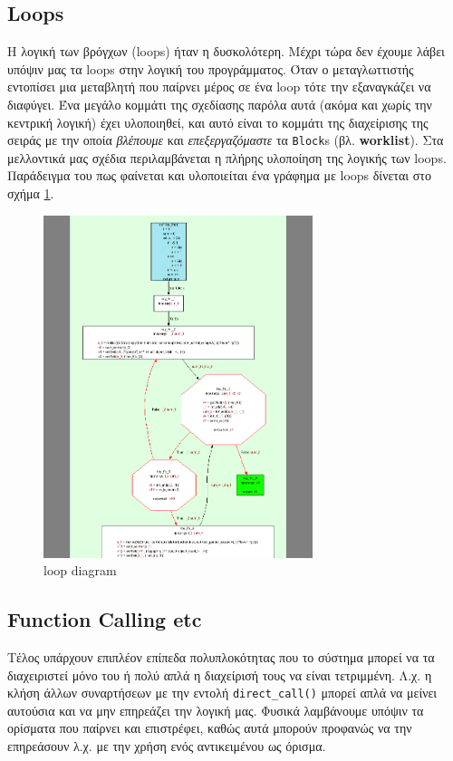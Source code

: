 \subsection{Loops}

Η λογική των βρόγχων (loops) ήταν η δυσκολότερη. Μέχρι τώρα δεν έχουμε λάβει
υπόψιν μας τα loops στην λογική του προγράμματος. Όταν ο μεταγλωττιστής
εντοπίσει μια μεταβλητή που παίρνει μέρος σε ένα loop τότε την εξαναγκάζει να
διαφύγει. Ένα μεγάλο κομμάτι της σχεδίασης παρόλα αυτά (ακόμα και χωρίς την
κεντρική λογική) έχει υλοποιηθεί, και αυτό είναι το κομμάτι της διαχείρισης της
σειράς με την οποία \textit{βλέπουμε} και \textit{επεξεργαζόμαστε} τα
\texttt{Block}s (βλ. \textbf{worklist}). Στα μελλοντικά μας σχέδια
περιλαμβάνεται η πλήρης υλοποίηση της λογικής των loops. Παράδειγμα του πως
φαίνεται και υλοποιείται ένα γράφημα με loops δίνεται στο σχήμα \ref{figure-5}.

\begin{figure}[h]
\centering
\includegraphics[width=0.7\textwidth]{loop-func.png}
\caption{loop diagram}
\label{figure-5}
\end{figure}

\subsection{Function Calling etc}

Τέλος υπάρχουν επιπλέον επίπεδα πολυπλοκότητας που το σύστημα μπορεί να τα
διαχειριστεί μόνο του ή πολύ απλά η διαχείρισή τους να είναι τετριμμένη. Λ.χ. η
κλήση άλλων συναρτήσεων με την εντολή \texttt{direct\_call()} μπορεί απλά να
μείνει αυτούσια και να μην επηρεάζει την λογική μας. Φυσικά λαμβάνουμε υπόψιν τα
ορίσματα που παίρνει και επιστρέφει, καθώς αυτά μπορούν προφανώς να την
επηρεάσουν λ.χ. με την χρήση ενός αντικειμένου ως όρισμα.


